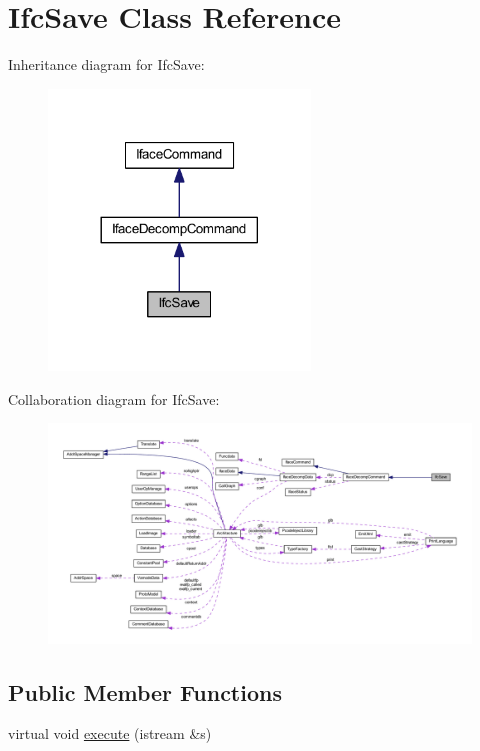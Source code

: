 \hypertarget{class_ifc_save}{}\section{Ifc\+Save Class Reference}
\label{class_ifc_save}


Inheritance diagram for Ifc\+Save\+:
\nopagebreak
\begin{figure}[H]
\begin{center}
\leavevmode
\includegraphics[width=197pt]{class_ifc_save__inherit__graph}
\end{center}
\end{figure}


Collaboration diagram for Ifc\+Save\+:
\nopagebreak
\begin{figure}[H]
\begin{center}
\leavevmode
\includegraphics[width=350pt]{class_ifc_save__coll__graph}
\end{center}
\end{figure}
\subsection*{Public Member Functions}
\begin{DoxyCompactItemize}
\item 
virtual void \mbox{\hyperlink{class_ifc_save_a56ac19bca1d3b3cff186db25db549a6d}{execute}} (istream \&s)
\end{DoxyCompactItemize}

